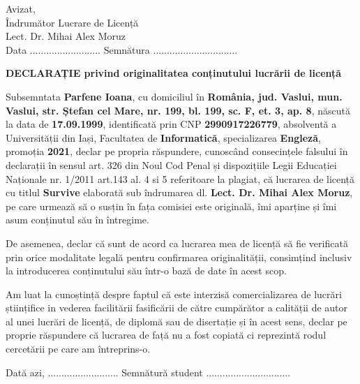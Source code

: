 \begin{flushright}
	Avizat,\\
	Îndrumător Lucrare de Licență\\
	Lect. Dr. Mihai Alex Moruz\\
	Data \small{..........................} Semnătura \small{...............................}
\end{flushright}

\begin{center}
	\textbf{\large{DECLARAȚIE privind originalitatea conținutului lucrării de licență}}
\end{center}

Subsemntata \textbf{Parfene Ioana}, cu domiciliul în \textbf{România, jud. Vaslui, mun. Vaslui, str. Ștefan cel Mare, nr. 199, bl. 199, sc. F, et. 3, ap. 8}, născută la data de  \textbf{17.09.1999}, identificată prin CNP \textbf{2990917226779}, absolventă a Universității  din Iași, Facultatea de \textbf{Informatică}, specializarea \textbf{Engleză}, promoția \textbf{2021}, declar pe propria răspundere, cunoscând consecințele falsului în declarații în sensul art. 326 din Noul Cod Penal și dispozițiile Legii Educației Naționale nr. 1/2011 art.143 al. 4 si 5 referitoare la plagiat, că lucrarea de licență cu titlul \textbf{Survive} elaborată sub îndrumarea dl. \textbf{Lect. Dr. Mihai Alex Moruz}, pe care urmează să o susțin în fața comisiei este originală, îmi aparține și îmi asum conținutul său în întregime.

De asemenea, declar că sunt de acord ca lucrarea mea de licență să fie verificată prin orice modalitate legală pentru confirmarea originalității, consimțind inclusiv la introducerea conținutului său într-o bază de date în acest scop.

Am luat la cunoștință despre faptul că este interzisă comercializarea de lucrări științifice in vederea facilitării fasificării de către cumpărător a calității de autor al unei lucrări de licență, de diplomă sau de disertație și în acest sens, declar pe proprie răspundere că lucrarea de față nu a fost copiată ci reprezintă rodul cercetării pe care am întreprins-o.


\hfill \break

Dată azi, \small{..........................} \hfill Semnătură student \small{...............................} \\

\newpage
